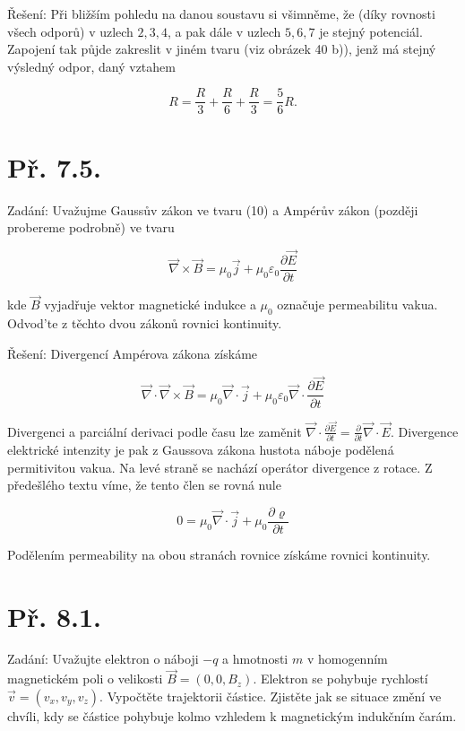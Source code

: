 \documentclass[czech,11pt,a4paper]{article}
\begin{document}
Řešení: Při bližším pohledu na danou soustavu si všimněme, že (díky rovnosti všech odporů) v uzlech $2,3,4$, a pak dále v uzlech $5,6,7$ je stejný potenciál. Zapojení tak půjde zakreslit v jiném tvaru (viz obrázek 40 b)), jenž má stejný výsledný odpor, daný vztahem

$$
R=\frac{R}{3}+\frac{R}{6}+\frac{R}{3}=\frac{5}{6} R .
$$


\section{Př. 7.5.}

Zadání: Uvažujme Gaussův zákon ve tvaru (10) a Ampérův zákon (později probereme podrobně) ve tvaru

$$
\vec{\nabla} \times \vec{B}=\mu_{0} \vec{j}+\mu_{0} \varepsilon_{0} \frac{\partial \vec{E}}{\partial t}
$$

kde $\vec{B}$ vyjadřuje vektor magnetické indukce a $\mu_{0}$ označuje permeabilitu vakua. Odvod’te z těchto dvou zákonů rovnici kontinuity.

Řešení: Divergencí Ampérova zákona získáme

$$
\vec{\nabla} \cdot \vec{\nabla} \times \vec{B}=\mu_{0} \vec{\nabla} \cdot \vec{j}+\mu_{0} \varepsilon_{0} \vec{\nabla} \cdot \frac{\partial \vec{E}}{\partial t}
$$

Divergenci a parciální derivaci podle času lze zaměnit $\vec{\nabla} \cdot \frac{\partial \vec{E}}{\partial t}=\frac{\partial}{\partial t} \vec{\nabla} \cdot \vec{E}$. Divergence elektrické intenzity je pak z Gaussova zákona hustota náboje podělená permitivitou vakua. Na levé straně se nachází operátor divergence $\mathrm{z}$ rotace. $\mathrm{Z}$ předešlého textu víme, že tento člen se rovná nule

$$
0=\mu_{0} \vec{\nabla} \cdot \vec{j}+\mu_{0} \frac{\partial \varrho}{\partial t}
$$

Podělením permeability na obou stranách rovnice získáme rovnici kontinuity.

\section{Př. 8.1.}

Zadání: Uvažujte elektron o náboji $-q$ a hmotnosti $m$ v homogenním magnetickém poli o velikosti $\vec{B}=\left(0,0, B_{z}\right)$. Elektron se pohybuje rychlostí $\vec{v}=\left(v_{x}, v_{y}, v_{z}\right)$. Vypočtěte trajektorii částice. Zjistěte jak se situace změní ve chvíli, kdy se částice pohybuje kolmo vzhledem k magnetickým indukčním čarám.
\end{document}
